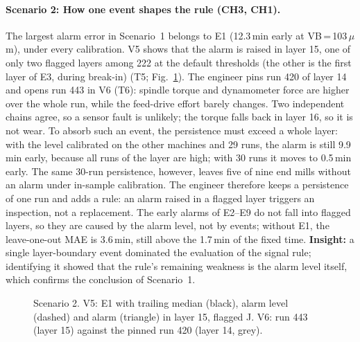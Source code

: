 \paragraph{Scenario 2: How one event shapes the rule (CH3, CH1).}
The largest alarm error in Scenario~1 belongs to E1 (12.3\,min early at VB\,=\,103\,$\mu$m), under every
calibration. V5 shows that the alarm is raised in layer 15, one of only two flagged layers among 222 at the
default thresholds (the other is the first layer of E3, during break-in) (T5; Fig.~\ref{fig:s2}). The engineer
pins run 420 of layer 14 and opens run 443 in V6 (T6): spindle torque and dynamometer force are higher over
the whole run, while the feed-drive effort barely changes. Two independent chains agree, so a sensor fault is
unlikely; the torque falls back in layer 16, so it is not wear. To absorb such an event, the persistence must
exceed a whole layer: with the level calibrated on the other machines and 29 runs, the alarm is still
9.9\,min early, because all runs of the layer are high; with 30 runs it moves to 0.5\,min early. The same
30-run persistence, however, leaves five of nine end mills without an alarm under in-sample calibration. The
engineer therefore keeps a persistence of one run and adds a rule: an alarm raised in a flagged layer
triggers an inspection, not a replacement. The early alarms of E2--E9 do not fall into flagged layers, so they
are caused by the alarm level, not by events; without E1, the leave-one-out MAE is 3.6\,min, still above the
1.7\,min of the fixed time. \textbf{Insight:} a single layer-boundary event dominated the evaluation of the
signal rule; identifying it showed that the rule's remaining weakness is the alarm level itself, which confirms
the conclusion of Scenario~1.

\begin{figure}[t]
\centering
{}
\caption{Scenario 2. V5: E1 with trailing median (black), alarm level (dashed) and alarm (triangle) in layer 15,
flagged J. V6: run 443 (layer 15) against the pinned run 420 (layer 14, grey).}
\label{fig:s2}
\end{figure}
